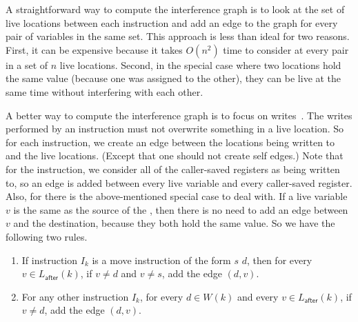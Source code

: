 \documentclass[7x10]{TimesAPriori_MIT}%
\begin{document}
A straightforward way to compute the interference graph is to look at
the set of live locations between each instruction and add an edge to
the graph for every pair of variables in the same set.  This approach
is less than ideal for two reasons. First, it can be expensive because
it takes $O(n^2)$ time to consider at every pair in a set of $n$ live
locations. Second, in the special case where two locations hold the
same value (because one was assigned to the other), they can be live
at the same time without interfering with each other.

A better way to compute the interference graph is to focus on
writes~\citep{Appel:2003fk}. The writes performed by an instruction
must not overwrite something in a live location. So for each
instruction, we create an edge between the locations being written to
and the live locations. (Except that one should not create self
edges.)  Note that for the  instruction, we consider all of
the caller-saved registers as being written to, so an edge is added
between every live variable and every caller-saved register. Also, for
 there is the above-mentioned special case to deal with. If
a live variable $v$ is the same as the source of the , then
there is no need to add an edge between $v$ and the destination,
because they both hold the same value.
%
So we have the following two rules.

\begin{enumerate}
\item If instruction $I_k$ is a move instruction of the form
   $s$\key{,} $d$, then for every $v \in
  L_{\mathsf{after}}(k)$, if $v \neq d$ and $v \neq s$, add the edge
  $(d,v)$.

\item For any other instruction $I_k$, for every $d \in W(k)$ and
  every $v \in L_{\mathsf{after}}(k)$, if $v \neq d$, add the edge
  $(d,v)$.
\end{enumerate}
\end{document}
